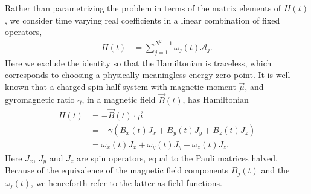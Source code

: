 \documentclass{jors}
\newcommand{\supervisordisagreement}[2]{\textcolor{green}{\texttt{{Supervisor disagreement!!! <<<<<<< Lincoln}}} \textcolor{blue}{#1} \textcolor{green}{\texttt{=======}} \textcolor{red}{#2} \textcolor{green}{\texttt{>>>>>>> James}}}
\begin{document}
		Rather than parametrizing the problem in terms of the matrix elements of $ H(t) $, we consider time varying real coefficients in a linear combination of fixed operators,
		\begin{align}
			H(t) &= \sum_{j = 1}^{N^2 - 1} \omega_j(t) \mathcal{A}_j.
		\end{align}
		Here we exclude the identity so that the Hamiltonian is traceless, which corresponds to choosing a physically meaningless energy zero point.
		It is well known that a charged spin-half system with magnetic moment $ \overrightarrow{\mu} $, and gyromagnetic ratio $ \gamma $, in a magnetic field $ \overrightarrow{B}(t) $, has Hamiltonian
		\begin{align}
			H(t) &= -\overrightarrow{B}(t)\cdot \overrightarrow{\mu}\\
			&= -\gamma \left(B_x(t) J_x + B_y(t) J_y + B_z(t) J_z\right)\\
			&= \omega_x(t) J_x + \omega_y(t) J_y + \omega_z(t) J_z.
		\end{align}
		Here $ J_x $, $ J_y $ and $ J_z $ are spin operators, equal to the Pauli matrices\cite[(p169)]{j_j_sakurai_jun_john_modern_2011} halved.
		Because of the equivalence of the magnetic field components $ B_j(t) $ and the $ \omega_j(t) $, we henceforth refer to the latter as field functions.
\end{document}
